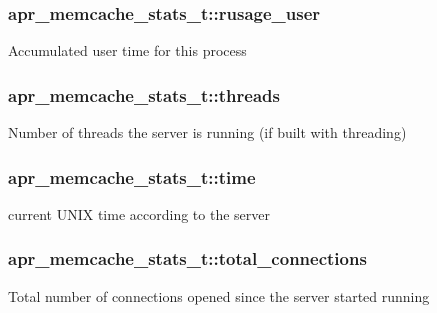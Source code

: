 \subsubsection[{\texorpdfstring{rusage\+\_\+user}{rusage_user}}]{ apr\+\_\+memcache\+\_\+stats\+\_\+t\+::rusage\+\_\+user}\hypertarget{structapr__memcache__stats__t_a4e43e96550407edd29e81ba59706c5b5}{}\label{structapr__memcache__stats__t_a4e43e96550407edd29e81ba59706c5b5}
Accumulated user time for this process 
\subsubsection[{\texorpdfstring{threads}{threads}}]{ apr\+\_\+memcache\+\_\+stats\+\_\+t\+::threads}\hypertarget{structapr__memcache__stats__t_a4e2a4875902e032a56de9ac58315f372}{}\label{structapr__memcache__stats__t_a4e2a4875902e032a56de9ac58315f372}
Number of threads the server is running (if built with threading) 
\subsubsection[{\texorpdfstring{time}{time}}]{ apr\+\_\+memcache\+\_\+stats\+\_\+t\+::time}\hypertarget{structapr__memcache__stats__t_adc02da0e6bfc619cd7eaebfae94404ff}{}\label{structapr__memcache__stats__t_adc02da0e6bfc619cd7eaebfae94404ff}
current U\+N\+IX time according to the server 
\subsubsection[{\texorpdfstring{total\+\_\+connections}{total_connections}}]{ apr\+\_\+memcache\+\_\+stats\+\_\+t\+::total\+\_\+connections}\hypertarget{structapr__memcache__stats__t_a47413a65552fa02fcc8adb74b3d0b8c0}{}\label{structapr__memcache__stats__t_a47413a65552fa02fcc8adb74b3d0b8c0}
Total number of connections opened since the server started running 
